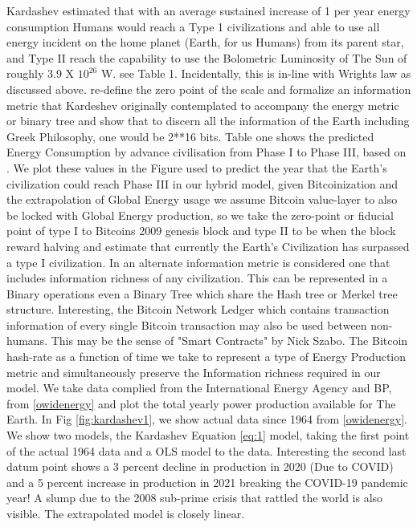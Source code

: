 \documentclass[final,5p,times,twocolumn,authoryear]{elsarticle}
\begin{document}
Kardashev estimated that with an average sustained increase of 1 \percent per year energy consumption Humans would reach a Type 1 civilizations and able to use all energy incident on the home planet (Earth, for us Humans) from its parent star, and Type II reach the capability to use the Bolometric Luminosity of The Sun of roughly 3.9 X $10^{26}$ W. see Table 1. Incidentally, this is in-line with Wrights law as  discussed above. \cite{Sagan73} re-define the zero point of the scale and formalize an information metric that Kardeshev originally contemplated to accompany the energy metric or binary tree and show that to discern all the information of the Earth including Greek Philosophy, one would be 2**16 bits. Table one shows the predicted Energy Consumption by advance civilisation from Phase I to Phase III, based on \cite{kar64}. We plot these values in the Figure  used to predict the year that the Earth's civilization could reach Phase III in our hybrid model, given Bitcoinization and the extrapolation of Global Energy usage we assume Bitcoin value-layer to also be locked with Global Energy production, so we take the zero-point or fiducial point of type I to Bitcoins 2009 genesis block and type II to be when the block reward halving and estimate that currently the Earth's Civilization has surpassed a type I civilization. In \cite{Sagan73} an alternate information metric is considered one that includes information richness of any civilization. This can be represented in a Binary operations even a Binary Tree which share the Hash tree or Merkel tree structure. Interesting, the Bitcoin Network Ledger which contains transaction information of every single Bitcoin transaction may also be used between non-humans. This may be the sense of "Smart Contracts" by Nick Szabo. The Bitcoin hash-rate as a function of time we take to represent a type of Energy Production metric and simultaneously preserve the Information richness required in our model. We take data complied from the International Energy Agency and BP, from \ref{owidenergy} and plot the total yearly power production available for The Earth. In Fig \ref{fig:kardashev1}, we show actual data since 1964 from \ref{owidenergy}. We show two models, the Kardashev Equation \ref{eq:1} model, taking the first point of the actual 1964 data and a OLS model to the data. Interesting the second last datum point shows a 3 percent decline in production in 2020 (Due to COVID) and a 5 percent increase in production in 2021 breaking the COVID-19 pandemic year! A slump due to the 2008 sub-prime crisis that rattled the world is also visible. The extrapolated model is closely linear.
\end{document}
